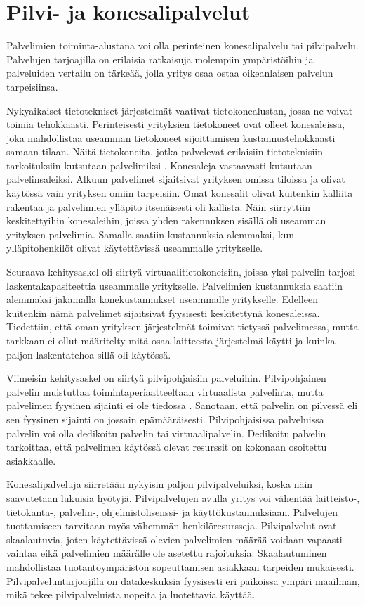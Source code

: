 \chapter{Pilvi- ja konesalipalvelut\label{konesalipalvelut}}
Palvelimien toiminta-alustana voi olla perinteinen konesalipalvelu tai pilvipalvelu. Palvelujen tarjoajilla on erilaisia ratkaisuja molempiin ympäristöihin ja palveluiden vertailu on tärkeää, jolla yritys osaa ostaa oikeanlaisen palvelun tarpeisiinsa. 

Nykyaikaiset tietotekniset järjestelmät vaativat tietokonealustan, jossa ne voivat toimia tehokkaasti. Perinteisesti yrityksien tietokoneet ovat olleet konesaleissa, joka mahdollistaa useamman tietokoneet sijoittamisen kustannustehokkaasti samaan tilaan. Näitä tietokoneita, jotka palvelevat erilaisiin tietoteknisiin tarkoituksiin kutsutaan palvelimiksi \citep{server_computing}. Konesaleja vastaavasti kutsutaan palvelinsaleiksi. Alkuun palvelimet sijaitsivat yrityksen omissa tiloissa ja olivat käytössä vain yrityksen omiin tarpeisiin. Omat konesalit olivat kuitenkin kalliita rakentaa ja palvelimien ylläpito itsenäisesti oli kallista. Näin siirryttiin keskitettyihin konesaleihin, joissa yhden rakennuksen sisällä oli useamman yrityksen palvelimia. Samalla saatiin kustannuksia alemmaksi, kun ylläpitohenkilöt olivat käytettävissä useammalle yritykselle.\citep{server_room}

Seuraava kehitysaskel oli siirtyä virtuaalitietokoneisiin, joissa yksi palvelin tarjosi laskentakapasiteettia useammalle yritykselle. Palvelimien kustannuksia saatiin alemmaksi jakamalla konekustannukset useammalle yritykselle. Edelleen kuitenkin nämä palvelimet sijaitsivat fyysisesti keskitettynä konesaleissa. Tiedettiin, että oman yrityksen järjestelmät toimivat tietyssä palvelimessa, mutta tarkkaan ei ollut määritelty mitä osaa laitteesta järjestelmä käytti ja kuinka paljon laskentatehoa sillä oli käytössä.\citep{virtual_server}

Viimeisin kehitysaskel on siirtyä pilvipohjaisiin palveluihin. Pilvipohjainen palvelin muistuttaa toimintaperiaatteeltaan virtuaalista palvelinta, mutta palvelimen fyysinen sijainti ei ole tiedossa \citep{cloud_computing}. Sanotaan, että palvelin on pilvessä eli sen fyysinen sijainti on jossain epämääräisesti. Pilvipohjaisissa palveluissa palvelin voi olla dedikoitu palvelin tai virtuaalipalvelin. Dedikoitu palvelin tarkoittaa, että palvelimen käytössä olevat resurssit on kokonaan osoitettu asiakkaalle. \citep{dedicated_hosting}

Konesalipalveluja siirretään nykyisin paljon pilvipalveluiksi, koska näin saavutetaan lukuisia hyötyjä. Pilvipalvelujen avulla yritys voi vähentää laitteisto-, tietokanta-, palvelin-, ohjelmistolisenssi- ja käyttökustannuksiaan. Palvelujen tuottamiseen tarvitaan myös vähemmän henkilöresursseja. Pilvipalvelut ovat skaalautuvia, joten käytettävissä olevien palvelimien määrää voidaan vapaasti vaihtaa eikä palvelimien määrälle ole asetettu rajoituksia. Skaalautuminen mahdollistaa tuotantoympäristön sopeuttamisen asiakkaan tarpeiden mukaisesti. Pilvipalveluntarjoajilla on datakeskuksia fyysisesti eri paikoissa ympäri maailman, mikä tekee pilvipalveluista nopeita ja luotettavia käyttää. \citep{top_cloud}

